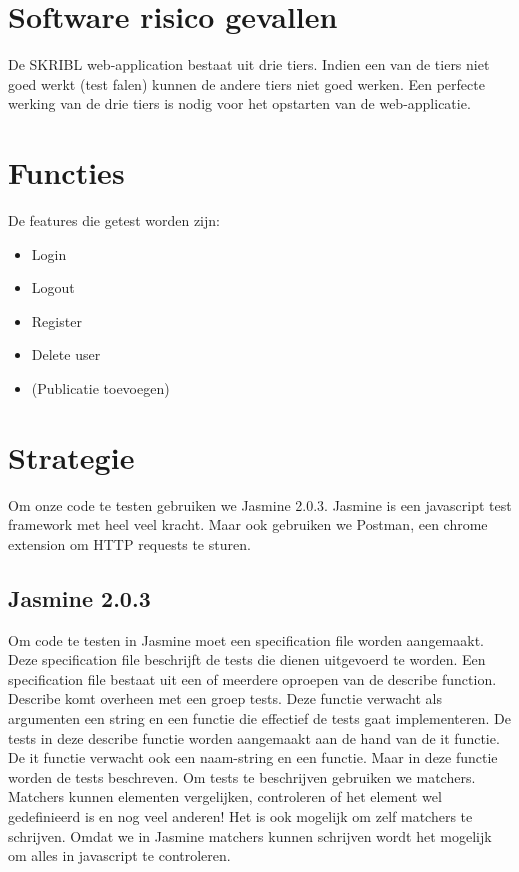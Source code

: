 \documentclass{article}
\begin{document}
\section{Software risico gevallen}
De SKRIBL web-application bestaat uit drie tiers. Indien een van de tiers niet goed werkt (test falen) kunnen de andere tiers niet goed werken. Een perfecte werking van de drie tiers is nodig voor het opstarten van de web-applicatie.

\section{Functies}
De features die getest worden zijn:
\begin{itemize}
  \item Login 
  \item Logout 
  \item Register
  \item Delete user
  \item (Publicatie toevoegen) 
\end{itemize}

\section{Strategie}
Om onze code te testen gebruiken we Jasmine 2.0.3. Jasmine is een javascript test framework met heel veel kracht. Maar ook gebruiken we Postman, een chrome extension om HTTP requests te sturen.

\subsection{Jasmine 2.0.3}
Om code te testen in Jasmine moet een specification file worden aangemaakt. Deze specification file beschrijft de tests die dienen uitgevoerd te worden. 
\newline
Een specification file bestaat uit een of meerdere oproepen van de describe function. Describe komt overheen met een groep tests. Deze functie verwacht als argumenten een string en een functie die effectief de tests gaat implementeren.
\newline
De tests in deze describe functie worden aangemaakt aan de hand van de it functie. De it functie verwacht ook een naam-string en een functie. Maar in deze %
functie worden de tests beschreven.
\newline
Om tests te beschrijven gebruiken we matchers. Matchers kunnen elementen vergelijken, controleren of het element wel gedefinieerd is 
en nog veel anderen! Het is ook mogelijk om zelf matchers te schrijven.
\newline
Omdat we in Jasmine matchers kunnen schrijven wordt het mogelijk om alles in javascript te controleren.
\end{document}
